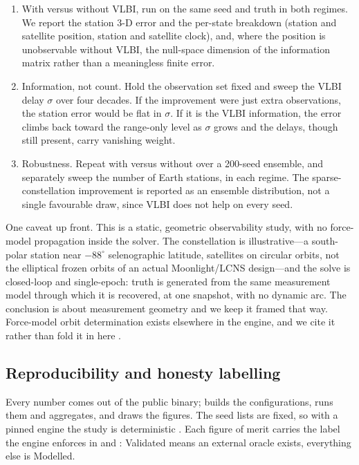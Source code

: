 \begin{enumerate}
  \item With versus without VLBI, run on the same seed and truth in both
    regimes. We report the station 3-D error and the per-state breakdown (station
    and satellite position, station and satellite clock), and, where the position
    is unobservable without VLBI, the null-space dimension of the information
    matrix rather than a meaningless finite error.
  \item Information, not count. Hold the observation set fixed and sweep the VLBI
    delay $\sigma$ over four decades. If the improvement were just extra
    observations, the station error would be flat in $\sigma$. If it is the VLBI
    information, the error climbs back toward the range-only level as $\sigma$
    grows and the delays, though still present, carry vanishing weight.
  \item Robustness. Repeat with versus without over a 200-seed ensemble, and
    separately sweep the number of Earth stations, in each regime. The
    sparse-constellation improvement is reported as an ensemble distribution, not
    a single favourable draw, since VLBI does not help on every seed.
\end{enumerate}

One caveat up front. This is a static, geometric observability study, with no
force-model propagation inside the solver. The constellation is illustrative---a
south-polar station near $-88^\circ$ selenographic latitude, satellites on
circular orbits, not the elliptical frozen orbits of an actual Moonlight/LCNS
design---and the solve is closed-loop and single-epoch: truth is generated from
the same measurement model through which it is recovered, at one snapshot, with no
dynamic arc. The conclusion is about measurement geometry and we keep it framed
that way. Force-model orbit determination exists elsewhere in the engine, and we
cite it rather than fold it in here
\citep{lemoine2013grail,bertone2021grail,li2023leopod}.

\subsection{Reproducibility and honesty labelling}

Every number comes out of the public  binary;
 builds the configurations, runs them and
aggregates, and  draws the figures. The seed lists
are fixed, so with a pinned engine the study is deterministic
\citep{fernandezprades2018reproducibility}. Each figure of merit carries the
label the engine enforces in  and
: Validated means an external oracle exists,
everything else is Modelled.

